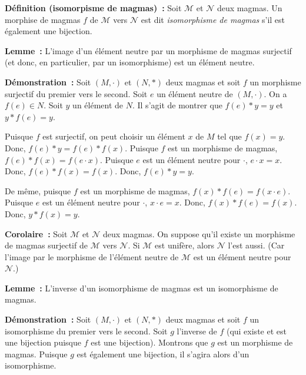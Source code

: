 \medskip

\noindent\textbf{Définition (isomorpisme de magmas) :} Soit $\mathcal{M}$ et $\mathcal{N}$ deux magmas.
    Un morphise de magmas $f$ de $\mathcal{M}$ vers $\mathcal{N}$ est dit \textit{isomorphisme de magmas} s'il est également une bijection.

\medskip

\noindent\textbf{Lemme :} L'image d'un élément neutre par un morphisme de magmas surjectif (et donc, en particulier, par un isomorphisme) est un élément neutre.

\medskip

\noindent\textbf{Démonstration :} Soit $\left(M, \cdot \right)$ et $\left(N, \ast \right)$ deux magmas et soit $f$ un morphisme surjectif du premier vers le second. 
    Soit $e$ un élément neutre de $\left(M, \cdot \right)$. 
    On a $f(e) \in N$. 
    Soit $y$ un élément de $N$. 
    Il s'agit de montrer que $f(e) \ast y = y$ et $y \ast f(e) = y$.

    Puisque $f$ est surjectif, on peut choisir un élément $x$ de $M$ tel que $f(x) = y$. 
    Donc, $f(e) \ast y = f(e) \ast f(x)$. 
    Puisque $f$ est un morphisme de magmas, $f(e) \ast f(x) = f(e \cdot x)$. 
    Puisque $e$ est un élément neutre pour $\cdot$, $e \cdot x = x$. 
    Donc, $f(e) \ast f(x) = f(x)$.
    Donc, $f(e) \ast y = y$. 

    De même, puisque $f$ est un morphisme de magmas, $f(x) \ast f(e) = f(x \cdot e)$. 
    Puisque $e$ est un élément neutre pour $\cdot$, $x \cdot e = x$. 
    Donc, $f(x) \ast f(e) = f(x)$.
    Donc, $y \ast f(x) = y$. 

    \hfill \square

\medskip

\noindent\textbf{Corolaire :} Soit $\mathcal{M}$ et $\mathcal{N}$ deux magmas. 
    On suppose qu'il existe un morphisme de magmas surjectif de $\mathcal{M}$ vers $\mathcal{N}$. 
    Si $\mathcal{M}$ est unifère, alors $\mathcal{N}$ l'est aussi. 
    (Car l'image par le morphisme de l'élément neutre de $\mathcal{M}$ est un élément neutre pour $\mathcal{N}$.)

\medskip

\noindent\textbf{Lemme :} L'inverse d'un isomorphisme de magmas est un isomorphisme de magmas.

\medskip

\noindent\textbf{Démonstration :} Soit $\left(M, \cdot \right)$ et $\left(N, \ast \right)$ deux magmas et soit $f$ un isomorphisme du premier vers le second. 
    Soit $g$ l'inverse de $f$ (qui existe et est une bijection puisque $f$ est une bijection). 
    Montrons que $g$ est un morphisme de magmas. 
    Puisque $g$ est également une bijection, il s'agira alors d'un isomorphisme. 

